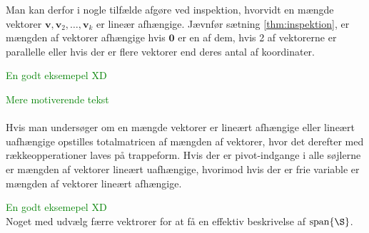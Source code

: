 %
Man kan derfor i nogle tilfælde afgøre ved inspektion, hvorvidt en mængde vektorer $\mathbf{v},\mathbf{v}_2,\ldots ,\mathbf{v}_k$ er lineær afhængige. 
Jævnfør sætning \ref{thm:inspektion}, er mængden af vektorer afhængige hvis $\mathbf{0}$ er en af dem, hvis 2 af vektorerne er parallelle eller hvis der er flere vektorer end deres antal af koordinater. 
%
\begin{eks}
\textcolor{green}{En godt eksemepel XD} 
\\

\end{eks}
%
%
\textcolor{green}{Mere motiverende tekst}\\\\
Hvis man undersøger om en mængde vektorer er lineært afhængige eller lineært uafhængige opstilles totalmatricen af mængden af vektorer, hvor det derefter med rækkeopperationer laves på trappeform. 
Hvis der er pivot-indgange i alle søjlerne er mængden af vektorer lineært uafhængige, hvorimod hvis der er frie variable er mængden af vektorer lineært afhængige. 
%
\begin{eks}
\textcolor{green}{En godt eksemepel XD} 
\\
Noget med udvælg færre vektrorer for at få en effektiv beskrivelse af $\text{span}\{\S\}$.
\end{eks}
%
%



